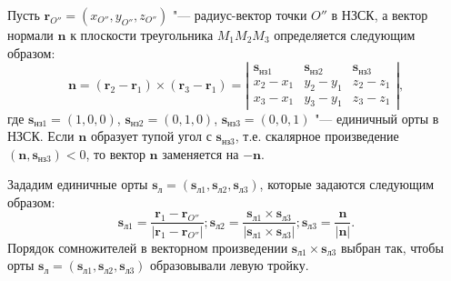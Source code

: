 \documentclass[../main.tex]{subfiles}
\begin{document}
Пусть $\mathbf{r}_{O''} = \left(x_{O''}, y_{O''}, z_{O''}\right)$ "--- радиус-вектор точки $O''$ в НЗСК, а вектор нормали $\mathbf{n}$ к плоскости треугольника $M_1 M_2 M_3$  определяется следующим образом:
\begin{equation*}
  \mathbf{n} = \left(\mathbf{r}_2 - \mathbf{r}_1\right) \times \left(\mathbf{r}_3 - \mathbf{r}_1\right) = \left| \begin{matrix}
    \mathbf{s}_{\text{нз}1} & \mathbf{s}_{\text{нз}2} & \mathbf{s}_{\text{нз}3} \\
    x_2 - x_1 & y_2 - y_1 & z_2 - z_1 \\
    x_3 - x_1 & y_3 - y_1 & z_3 - z_1
  \end{matrix}\right|,
\end{equation*}
где $\mathbf{s}_{\text{нз}1} = \left(1, 0, 0\right)$, $\mathbf{s}_{\text{нз}2} = \left(0, 1, 0\right)$, $\mathbf{s}_{\text{нз}3} = \left(0, 0, 1\right)$ "--- единичный орты в НЗСК. Если $\mathbf{n}$ образует тупой угол с $\mathbf{s}_{\text{нз}3}$, т.е. скалярное произведение  $\left(\mathbf{n}, \mathbf{s}_{\text{нз}3}\right) < 0$, то вектор $\mathbf{n}$ заменяется на $-\mathbf{n}$.

Зададим единичные орты $\mathbf{s}_\text{л} = \left(\mathbf{s}_{\text{л}1}, \mathbf{s}_{\text{л}2}, \mathbf{s}_{\text{л}3}\right)$, которые задаются следующим образом:
\begin{equation*}
  \mathbf{s}_{\text{л}1} = \frac{\mathbf{r}_1 - \mathbf{r}_{O''}}{\left|\mathbf{r}_1 - \mathbf{r}_{O''}\right|};
  \mathbf{s}_{\text{л}2} = \frac{\mathbf{s}_{\text{л}1} \times \mathbf{s}_{\text{л}3}}{\left|\mathbf{s}_{\text{л}1} \times \mathbf{s}_{\text{л}3}\right|};
  \mathbf{s}_{\text{л}3} = \frac{\mathbf{n}}{\left|\mathbf{n}\right|}.
\end{equation*}
Порядок сомножителей в векторном произведении $\mathbf{s}_{\text{л}1} \times \mathbf{s}_{\text{л}3}$ выбран так, чтобы орты $\mathbf{s}_\text{л} = \left(\mathbf{s}_{\text{л}1}, \mathbf{s}_{\text{л}2}, \mathbf{s}_{\text{л}3}\right)$ образовывали левую тройку.
\end{document}
